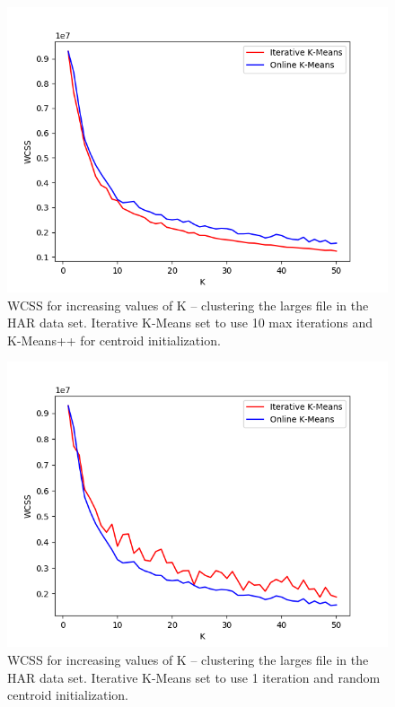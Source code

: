 \documentclass{l4proj}
\begin{document}
\begin{appendices}
\begin{figure}[H]
	\centering
    \label{fig:res8}
    \includegraphics[width=1.0\textwidth]{images/result8}
    \caption{WCSS for increasing values of K -- clustering the larges file in the HAR data set. Iterative K-Means set to use 10 max iterations and K-Means++ for centroid initialization. } 
\end{figure}

\begin{figure}[H]
	\centering
    \label{fig:res9}
    \includegraphics[width=1.0\textwidth]{images/result9}
    \caption{WCSS for increasing values of K -- clustering the larges file in the HAR data set. Iterative K-Means set to use 1 iteration and random centroid initialization. } 
\end{figure}


\end{appendices}
\end{document}
